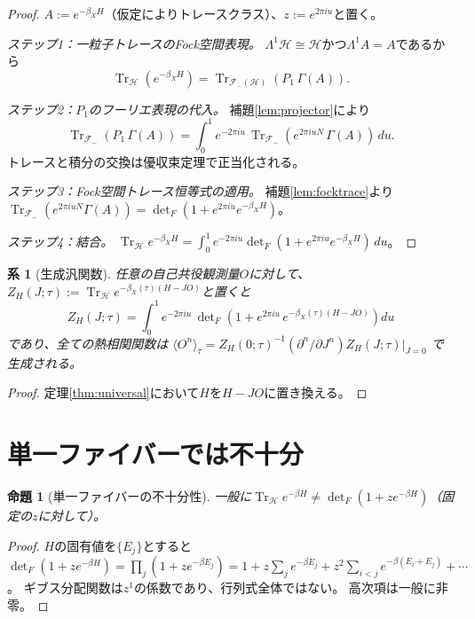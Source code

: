 \documentclass[12pt]{article}
\theoremstyle{plain}
\newtheorem{proposition}[theorem]{命題}
\newtheorem{corollary}[theorem]{系}
\theoremstyle{definition}
\numberwithin{equation}{section}
\DeclareMathOperator{\Tr}{Tr}
\begin{document}
\begin{proof}
$A:=e^{-\beta_X H}$（仮定によりトレースクラス）、$z:=e^{2\pi iu}$と置く。

\emph{ステップ1：一粒子トレースのFock空間表現。}
$\Lambda^1\mathcal{H}\cong\mathcal{H}$かつ$\Lambda^1 A=A$であるから
\[
\Tr_{\mathcal{H}}(e^{-\beta_X H})
= \Tr_{\mathcal{F}_-(\mathcal{H})}(P_1\,\Gamma(A)).
\]

\emph{ステップ2：$P_1$のフーリエ表現の代入。}
補題\ref{lem:projector}により
\[
\Tr_{\mathcal{F}_-}(P_1\,\Gamma(A))
= \int_0^1 e^{-2\pi iu}\,
\Tr_{\mathcal{F}_-}(e^{2\pi iuN}\,\Gamma(A))\,du.
\]
トレースと積分の交換は優収束定理で正当化される。

\emph{ステップ3：Fock空間トレース恒等式の適用。}
補題\ref{lem:focktrace}より
$\Tr_{\mathcal{F}_-}(e^{2\pi iuN}\Gamma(A))
= \det_F(1+e^{2\pi iu}e^{-\beta_X H})$。

\emph{ステップ4：結合。}
$\Tr_{\mathcal{H}}e^{-\beta_X H}
= \int_0^1 e^{-2\pi iu}\det_F(1+e^{2\pi iu}e^{-\beta_X H})\,du$。
\end{proof}

\begin{corollary}[生成汎関数]\label{cor:generating}
任意の自己共役観測量$O$に対して、
$Z_H(J;\tau) := \Tr_{\mathcal{H}}e^{-\beta_X(\tau)(H-JO)}$と置くと
\begin{equation}
Z_H(J;\tau)
= \int_0^1 e^{-2\pi iu}\,
\det\nolimits_F\!\left(1+e^{2\pi iu}\,e^{-\beta_X(\tau)(H-JO)}\right)du
\end{equation}
であり、全ての熱相関関数は
$\langle O^n\rangle_\tau
= Z_H(0;\tau)^{-1}(\partial^n/\partial J^n)Z_H(J;\tau)|_{J=0}$
で生成される。
\end{corollary}

\begin{proof}
定理\ref{thm:universal}において$H$を$H-JO$に置き換える。
\end{proof}


\section{単一ファイバーでは不十分}\label{sec:singlefiber}

\begin{proposition}[単一ファイバーの不十分性]\label{prop:singlefiber}
一般に$\Tr_{\mathcal{H}}e^{-\beta H}
\neq \det_F(1+ze^{-\beta H})$（固定の$z$に対して）。
\end{proposition}

\begin{proof}
$H$の固有値を$\{E_j\}$とすると
$\det_F(1+ze^{-\beta H})
= \prod_j(1+ze^{-\beta E_j})
= 1 + z\sum_j e^{-\beta E_j} + z^2\sum_{i<j}e^{-\beta(E_i+E_j)} + \cdots$。
ギブス分配関数は$z^1$の係数であり、行列式全体ではない。
高次項は一般に非零。
\end{proof}
\end{document}
